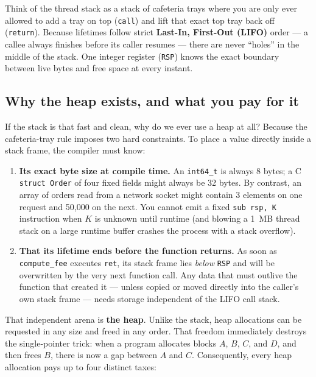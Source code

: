\begin{intuitionbox}
Think of the thread stack as a stack of cafeteria trays where you are only ever allowed to add a tray on top (\texttt{call}) and lift that exact top tray back off (\texttt{return}). Because lifetimes follow strict \textbf{Last-In, First-Out (LIFO)} order --- a callee always finishes before its caller resumes --- there are never ``holes'' in the middle of the stack. One integer register (\texttt{RSP}) knows the exact boundary between live bytes and free space at every instant.
\end{intuitionbox}

\subsection{Why the heap exists, and what you pay for it}

If the stack is that fast and clean, why do we ever use a heap at all? Because the cafeteria-tray rule imposes two hard constraints. To place a value directly inside a stack frame, the compiler must know:
\begin{enumerate}
  \item \textbf{Its exact byte size at compile time.} An \texttt{int64\_t} is always 8 bytes; a C \texttt{struct Order} of four fixed fields might always be 32 bytes. By contrast, an array of orders read from a network socket might contain 3 elements on one request and 50{,}000 on the next. You cannot emit a fixed \texttt{sub rsp, K} instruction when $K$ is unknown until runtime (and blowing a 1~MB thread stack on a large runtime buffer crashes the process with a stack overflow).
  \item \textbf{That its lifetime ends before the function returns.} As soon as \texttt{compute\_fee} executes \texttt{ret}, its stack frame lies \emph{below} \texttt{RSP} and will be overwritten by the very next function call. Any data that must outlive the function that created it --- unless copied or moved directly into the caller's own stack frame --- needs storage independent of the LIFO call stack.
\end{enumerate}

That independent arena is \textbf{the heap}. Unlike the stack, heap allocations can be requested in any size and freed in any order. That freedom immediately destroys the single-pointer trick: when a program allocates blocks $A$, $B$, $C$, and $D$, and then frees $B$, there is now a gap between $A$ and $C$. Consequently, every heap allocation pays up to four distinct taxes:


